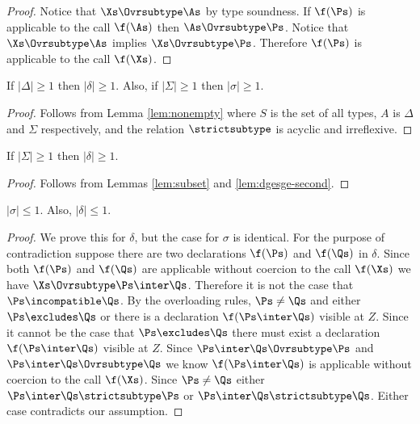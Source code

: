\begin{proof}
Notice that $\Xs \Ovrsubtype \As$ by type soundness.
If $\f(\Ps)$ is applicable to
the call $\f(\As)$ then $\As \Ovrsubtype \Ps$.  Notice that $\Xs
\Ovrsubtype \As$ implies $\Xs \Ovrsubtype \Ps$.  Therefore
$\f(\Ps)$ is applicable to the call $\f(\Xs)$.
\end{proof}

\begin{lemma}
\label{lem:dgesge-second}
If $|\Delta| \ge 1$ then $|\delta| \ge 1$.
Also, if $|\Sigma| \ge 1$ then $|\sigma| \ge 1$.
\end{lemma}

\begin{proof}
Follows from Lemma \ref{lem:nonempty} where $S$ is the set of all
types, $A$ is $\Delta$ and $\Sigma$ respectively,
and the relation $\strictsubtype$ is acyclic and irreflexive.
\end{proof}

\begin{lemma}
\label{lem:ge}
If $|\Sigma| \ge 1$ then $|\delta| \ge 1$.
\end{lemma}

\begin{proof}
Follows from Lemmas \ref{lem:subset} and \ref{lem:dgesge-second}.
\end{proof}

\begin{lemma}
\label{lem:le}
$|\sigma| \le 1$.  Also, $|\delta| \le 1$.
\end{lemma}

\begin{proof}
We prove this for $\delta$, but the case for $\sigma$ is identical.
For the purpose of contradiction suppose there are two declarations
$\f(\Ps)$ and $\f(\Qs)$ in $\delta$.  Since both $\f(\Ps)$ and
$\f(\Qs)$ are applicable without coercion to the call $\f(\Xs)$ we
have $\Xs \Ovrsubtype \Ps \inter \Qs$.  Therefore it is not the case
that $\Ps \incompatible \Qs$.  By the overloading rules, $\Ps
\neq \Qs$ and either $\Ps \excludes \Qs$ or there is a declaration
$\f(\Ps \inter \Qs)$ visible at $Z$.  Since it cannot be the case that
$\Ps \excludes \Qs$ there must exist a declaration $\f(\Ps \inter
\Qs)$ visible at $Z$.  Since $\Ps \inter \Qs \Ovrsubtype \Ps$ and $\Ps
\inter \Qs \Ovrsubtype \Qs$ we know $\f(\Ps \inter \Qs)$ is applicable
without coercion to the call $\f(\Xs)$.  Since $\Ps \neq \Qs$ either
$\Ps \inter \Qs \strictsubtype \Ps$ or $\Ps \inter \Qs \strictsubtype
\Qs$.  Either case contradicts our assumption.
\end{proof}

